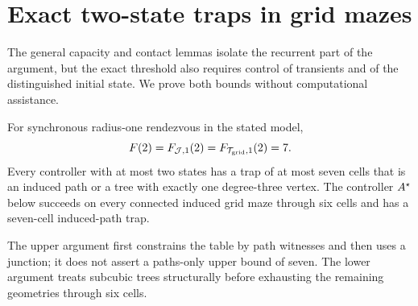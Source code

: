 \section{Exact two-state traps in grid mazes}\label{sec:two-state}

The general capacity and contact lemmas isolate the recurrent part of the argument,
but the exact threshold also requires control of transients and of the distinguished
initial state. We prove both bounds without computational assistance.

\begin{theorem}\label{thm:B}\label{thm:C}
For synchronous radius-one rendezvous in the stated model,
\[
 F(2)=F_{\mathcal J,1}(2)=F_{\mathcal T_{\rm grid},1}(2)=7.
\]
Every controller with at most two states has a trap of at most seven cells that is
an induced path or a tree with exactly one degree-three vertex. The controller
$A^{\star}$ below succeeds on every connected induced grid maze through six cells and
has a seven-cell induced-path trap.
\end{theorem}

The upper argument first constrains the table by path
witnesses and then uses a junction; it does not assert a paths-only upper bound of
seven. The lower argument treats subcubic trees structurally before exhausting the
remaining geometries through six cells.






